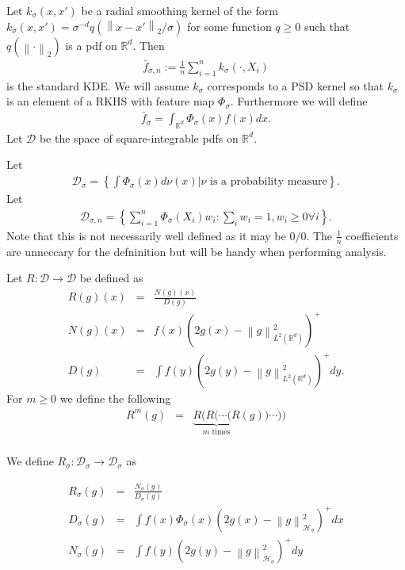 \documentclass{article} %
\def\hsig{{\mathcal{H}_\sigma}}
\def\d2{{\mathcal{D}}}
\def\dsig{{\mathcal{D}_\sigma}}
\def\dsign{{\mathcal{D}_{\sigma,n}}}
\def\ksig{{k_\sigma}}
\def\kde{{\bar{f}_{\sigma,n}}} %
\def\gkde{{\bar{f}_\sigma}} %
\def\fm{{\Phi_\sigma}} %
\def\girwl{{R_{\sigma}}}
\def\rn{\mathbb{R}}
\def\l{\left}
\def\r{\right}
\theoremstyle{definition}
\begin{document}
Let $\ksig\l(x,x'\r)$ be a radial smoothing kernel of the form $\ksig\l(x,x'\r) = \sigma^{-d} q\l(\l\|x-x'\r\|_2/\sigma\r)$ for some function $q\ge0$ such that $q\l(\l\|\cdot\r\|_2\r)$ is a pdf on $\rn^d$. Then
\begin{eqnarray*}
	\kde := \frac{1}{n}\sum_{i=1}^n\ksig\l(\cdot,X_i\r)
\end{eqnarray*}
is the standard KDE.
We will assume $\ksig$ corresponds to a PSD kernel so that $\ksig$ is an element of a RKHS with feature map $\fm$.
Furthermore we will define
\begin{eqnarray*}
	\gkde = \int_{\rn^d} \fm\left( x \right) f\left( x \right) dx.
\end{eqnarray*}
Let $\d2$ be the space of square-integrable pdfs on $\rn^d$.

Let 
\begin{eqnarray*}
	\dsig =\left\{\int \Phi_\sigma(x) d\nu(x) \Big| \nu \textrm{ is a probability measure}  \right\}.
\end{eqnarray*}
Let 
\begin{eqnarray*}
	\dsign = \left\{ \sum_{i=1}^n \fm\left( X_i \right)w_i : \sum_i w_i = 1, w_i\ge0 \forall i  \right\}.
\end{eqnarray*}
Note that this is not necessarily well defined as it may be $0/0$. The $\frac{1}{n}$ coefficients are unneccary for the defninition but will be handy when performing analysis.

Let $R:\d2 \to \d2$ be defined as 
\begin{eqnarray*}
	R(g)(x) &=& \frac{N(g)(x)}{D(g)}\\
	N(g)(x) &=&f(x) \left( 2g(x) - \l\|g\r\|^2_{L^2\left( \rn^d \right)} \right)^+\\
	D(g) &=&\int f(y) \left( 2g(y) - \l\|g\r\|^2_{L^2\left( \rn^d \right)}\right)^+ dy.
\end{eqnarray*}
For $m\ge 0 $ we define the following
\begin{eqnarray*}
	R^m(g) &=& \underbrace{R(R(\cdots (R}_{m \text{ times}}(g)) \cdots )) \\
\end{eqnarray*}


We define $\girwl:\dsig \to \dsig$ as

\begin{eqnarray*}
	\girwl\left( g \right) &=& \frac{N_\sigma(g)}{D_\sigma(g)}\\
	D_\sigma(g) &=& \int f\left( x \right) \fm\left( x \right) \left( 2g\left( x \right) - \l\|g\r\|_\hsig^2 \right)^+ dx \\
	N_\sigma(g) &=& \int f\left( y \right)  \left( 2g\left( y \right) - \l\|g\r\|_\hsig^2 \right)^+ dy
\end{eqnarray*}
\end{document}
